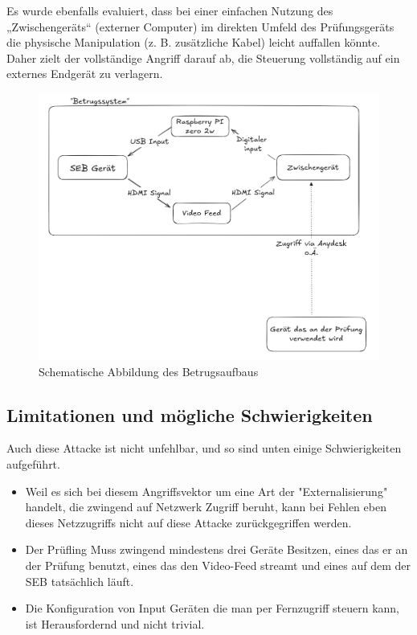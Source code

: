 \documentclass[14pt]{article}
\begin{document}
Es wurde ebenfalls evaluiert, dass bei einer einfachen Nutzung des „Zwischengeräts“ (externer Computer) im direkten Umfeld des Prüfungsgeräts die physische Manipulation (z. B. zusätzliche Kabel) leicht auffallen könnte. Daher zielt der vollständige Angriff darauf ab, die Steuerung vollständig auf ein externes Endgerät zu verlagern. 

\begin{figure}[h!]
	
	\includegraphics[width=\linewidth]{./images/schematic1.png}
	\caption{Schematische Abbildung des Betrugsaufbaus}

\end{figure}

\subsection{Limitationen und mögliche Schwierigkeiten}

Auch diese Attacke ist nicht unfehlbar, und so sind unten einige Schwierigkeiten aufgeführt.

\begin{itemize}
	\item Weil es sich bei diesem Angriffsvektor um eine Art der "Externalisierung" handelt, die zwingend auf Netzwerk Zugriff beruht, kann bei Fehlen eben dieses Netzzugriffs nicht auf diese Attacke zurückgegriffen werden. 

	\item Der Prüfling Muss zwingend mindestens drei Geräte Besitzen, eines das er an der Prüfung benutzt, eines das den Video-Feed streamt und eines auf dem der SEB tatsächlich läuft. 
	
	\item Die Konfiguration von Input Geräten die man per Fernzugriff steuern kann, ist Herausfordernd und nicht trivial.

\end{itemize}
\end{document}
